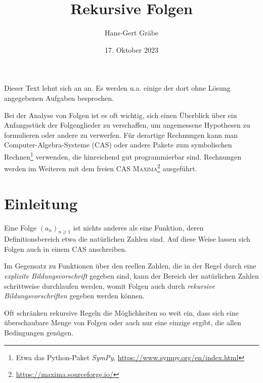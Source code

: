 \documentclass[11pt,a4paper]{article}
\title{Rekursive Folgen}
\author{Hans-Gert Gräbe}
\date{17. Oktober 2023}
\newcommand{\cas}[1]{\textsc{#1}}
\begin{document}
\maketitle

Dieser Text lehnt sich an \cite{S} an. Es werden u.a. einige der dort ohne
Lösung angegebenen Aufgaben besprochen.

Bei der Analyse von Folgen ist es oft wichtig, sich einen Überblick über ein
Anfangsstück der Folgenglieder zu verschaffen, um angemessene Hypothesen zu
formulieren oder andere zu verwerfen.  Für derartige Rechnungen kann man
Computer-Algebra-Systeme (CAS) oder andere Pakete zum symbolischen
Rechnen\footnote{Etwa das Python-Paket \emph{SymPy},
\url{https://www.sympy.org/en/index.html} } verwenden, die hinreichend gut
programmierbar sind.  Rechnungen werden im Weiteren mit dem freien CAS
\cas{Maxima}\footnote{\url{https://maxima.sourceforge.io/}} ausgeführt.

\section*{Einleitung}

Eine Folge $(a_n)_{n\ge 1}$ ist nichts anderes als eine Funktion, deren
Definitionsbereich etwa die natürlichen Zahlen sind. Auf diese Weise lassen
sich Folgen auch in einem CAS anschreiben.

Im Gegensatz zu Funktionen über den reellen Zahlen, die in der Regel durch
eine \emph{explizite Bildungsvorschrift} gegeben sind, kann der Bereich der
natürlichen Zahlen schrittweise durchlaufen werden, womit Folgen auch durch
\emph{rekursive Bildungsvorschriften} gegeben werden können. 

Oft schränken rekursive Regeln die Möglichkeiten so weit ein, dass sich eine
überschaubare Menge von Folgen oder auch nur eine einzige ergibt, die allen
Bedingungen genügen. 
\end{document}
